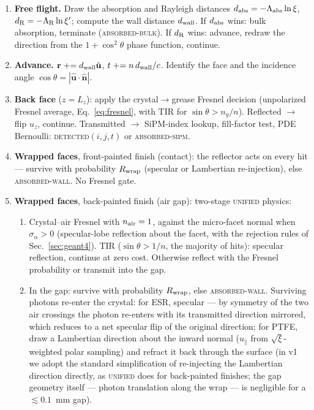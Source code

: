 \documentclass[11pt,a4paper]{article}
\begin{document}
\begin{enumerate}
  \item \textbf{Free flight.} Draw the absorption and Rayleigh distances
    $d_{\rm abs} = -\Lambda_{\rm abs} \ln \xi$, $d_{\rm R} = -\Lambda_{\rm R} \ln \xi'$;
    compute the wall distance $d_{\rm wall}$. If $d_{\rm abs}$ wins: bulk absorption,
    terminate (\textsc{absorbed-bulk}). If $d_{\rm R}$ wins: advance, redraw the direction
    from the $1+\cos^2\theta$ phase function, continue.
  \item \textbf{Advance.} $\mathbf{r} \mathrel{+}= d_{\rm wall}\hat{\mathbf{u}}$,
    $t \mathrel{+}= n\, d_{\rm wall}/c$. Identify the face and the incidence angle
    $\cos\theta = |\hat{\mathbf{u}}\cdot\hat{\mathbf{n}}|$.
  \item \textbf{Back face} ($z = L_z$): apply the crystal$\to$grease Fresnel decision
    (unpolarized Fresnel average, Eq.~\ref{eq:fresnel}, with TIR for
    $\sin\theta > n_g/n$). Reflected $\to$ flip $u_z$, continue. Transmitted $\to$
    SiPM-index lookup, fill-factor test, PDE Bernoulli: \textsc{detected}$(i,j,t)$ or
    \textsc{absorbed-sipm}.
  \item \textbf{Wrapped faces}, front-painted finish (contact): the reflector acts on
    every hit --- survive with probability $R_{\rm wrap}$ (specular or Lambertian
    re-injection), else \textsc{absorbed-wall}. No Fresnel gate.
  \item \textbf{Wrapped faces}, back-painted finish (air gap): two-stage \textsc{unified}
    physics:
    \begin{enumerate}
      \item Crystal--air Fresnel with $n_{\rm air}=1$, against the micro-facet normal when
        $\sigma_\alpha > 0$ (specular-lobe reflection about the facet, with the rejection
        rules of Sec.~\ref{sec:geant4}). TIR ($\sin\theta > 1/n$, the majority
        of hits): specular reflection, continue at zero cost. Otherwise
        reflect with the Fresnel probability or transmit into the gap.
      \item In the gap: survive with probability $R_{\rm wrap}$, else
        \textsc{absorbed-wall}. Surviving photons re-enter the crystal: for ESR, specular
        --- by symmetry of the two air crossings the photon re-enters with its transmitted
        direction mirrored, which reduces to a net specular flip of the original direction;
        for PTFE, draw a Lambertian direction about the inward normal
        ($u_\parallel$ from $\sqrt{\xi}$-weighted polar sampling) and refract it back
        through the surface (in v1 we adopt the standard simplification of re-injecting the
        Lambertian direction directly, as \textsc{unified} does for back-painted finishes;
        the gap geometry itself --- photon translation along the wrap --- is negligible for
        a $\lesssim 0.1$~mm gap).
    \end{enumerate}
\end{enumerate}
\end{document}
